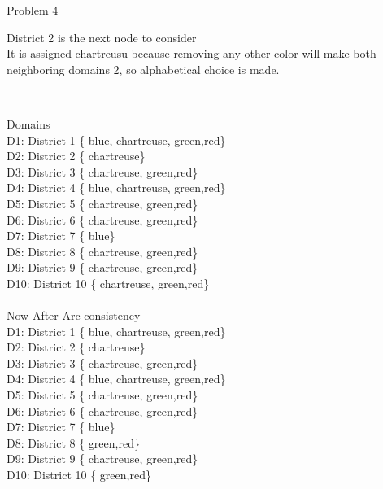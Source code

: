 \documentclass{article}
\begin{document}
Problem 4
\begin{p4}
District 2 is the next node to consider\\
It is assigned chartreusu because removing any other color will make both \\
neighboring domains 2, so alphabetical choice is made. \\
\end{p4}
\vspace{3mm} \\
\begin{p42}
Domains\\ 
D1: District 1 \left\{ {blue, chartreuse, green,red}\right\} \\
D2: District 2 \left\{ {chartreuse}\right\} \\
D3: District 3 \left\{ {chartreuse, green,red}\right\} \\
D4: District 4 \left\{ {blue, chartreuse, green,red}\right\} \\
D5: District 5 \left\{ {chartreuse, green,red}\right\} \\
D6: District 6 \left\{ {chartreuse, green,red}\right\} \\
D7: District 7 \left\{ {blue}\right\} \\
D8: District 8 \left\{ {chartreuse, green,red}\right\} \\
D9: District 9 \left\{ {chartreuse, green,red}\right\} \\
D10: District 10 \left\{ {chartreuse, green,red}\right\} \\
\\
Now  After Arc consistency \\
D1: District 1 \left\{ {blue, chartreuse, green,red}\right\} \\
D2: District 2 \left\{ {chartreuse}\right\} \\
D3: District 3 \left\{ {chartreuse, green,red}\right\} \\
D4: District 4 \left\{ {blue, chartreuse, green,red}\right\} \\
D5: District 5 \left\{ {chartreuse, green,red}\right\} \\
D6: District 6 \left\{ {chartreuse, green,red}\right\} \\
D7: District 7 \left\{ {blue}\right\} \\
D8: District 8 \left\{ {green,red}\right\} \\
D9: District 9 \left\{ {chartreuse, green,red}\right\} \\
D10: District 10 \left\{ {green,red}\right\} \\
\end{p42}
\end{document}
